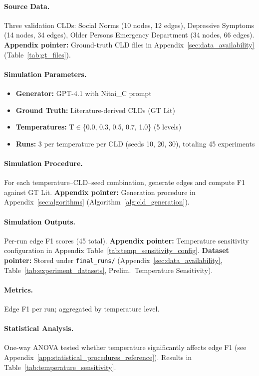 \paragraph{Source Data.}
Three validation CLDs: Social Norms (10 nodes, 12 edges), Depressive Symptoms (14 nodes, 34 edges), Older Persons Emergency Department (34 nodes, 66 edges).
\textbf{Appendix pointer:} Ground-truth CLD files in Appendix~\ref{sec:data_availability} (Table~\ref{tab:gt_files}).

\paragraph{Simulation Parameters.}
\begin{itemize}[noitemsep]
    \item \textbf{Generator:} GPT-4.1 with Nitai\_C prompt
    \item \textbf{Ground Truth:} Literature-derived CLDs (GT Lit)
    \item \textbf{Temperatures:} T$\in$\{0.0, 0.3, 0.5, 0.7, 1.0\} (5 levels)
    \item \textbf{Runs:} 3 per temperature per CLD (seeds 10, 20, 30), totaling 45 experiments
\end{itemize}

\paragraph{Simulation Procedure.}
For each temperature--CLD--seed combination, generate edges and compute F1 against GT Lit.
\textbf{Appendix pointer:} Generation procedure in Appendix~\ref{sec:algorithms} (Algorithm~\ref{alg:cld_generation}).

\paragraph{Simulation Outputs.}
Per-run edge F1 scores (45 total).
\textbf{Appendix pointer:} Temperature sensitivity configuration in Appendix Table~\ref{tab:temp_sensitivity_config}.
\textbf{Dataset pointer:} Stored under \texttt{final\_runs/} (Appendix~\ref{sec:data_availability}, Table~\ref{tab:experiment_datasets}, Prelim.\ Temperature Sensitivity).

\paragraph{Metrics.}
Edge F1 per run; aggregated by temperature level.

\paragraph{Statistical Analysis.}
One-way ANOVA tested whether temperature significantly affects edge F1 (see Appendix~\ref{app:statistical_procedures_reference}). Results in Table~\ref{tab:temperature_sensitivity}.

